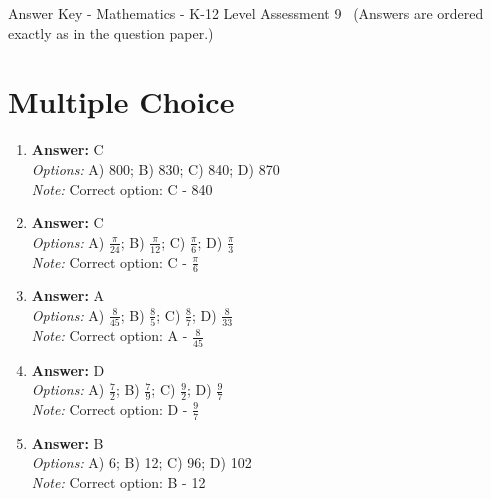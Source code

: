 \documentclass[12pt]{article}
\begin{document}
\begin{center}
Answer Key - Mathematics - K-12 Level Assessment 9 \
\small (Answers are ordered exactly as in the question paper.)
\end{center}

\section*{Multiple Choice}
\begin{enumerate}[label=\arabic*.]
\item \textbf{Answer:} C
\\ \textit{Options:} A) 800; B) 830; C) 840; D) 870
\\ \textit{Note:} Correct option: C - 840
\item \textbf{Answer:} C
\\ \textit{Options:} A) \ensuremath{\frac{\pi}{24}}; B) \ensuremath{\frac{\pi}{12}}; C) \ensuremath{\frac{\pi}{6}}; D) \ensuremath{\frac{\pi}{3}}
\\ \textit{Note:} Correct option: C - \ensuremath{\frac{\pi}{6}}
\item \textbf{Answer:} A
\\ \textit{Options:} A) \ensuremath{\frac{8}{45}}; B) \ensuremath{\frac{8}{5}}; C) \ensuremath{\frac{8}{7}}; D) \ensuremath{\frac{8}{33}}
\\ \textit{Note:} Correct option: A - \ensuremath{\frac{8}{45}}
\item \textbf{Answer:} D
\\ \textit{Options:} A) \ensuremath{\frac{7}{2}}; B) \ensuremath{\frac{7}{9}}; C) \ensuremath{\frac{9}{2}}; D) \ensuremath{\frac{9}{7}}
\\ \textit{Note:} Correct option: D - \ensuremath{\frac{9}{7}}
\item \textbf{Answer:} B
\\ \textit{Options:} A) 6; B) 12; C) 96; D) 102
\\ \textit{Note:} Correct option: B - 12
\end{enumerate}
\end{document}
